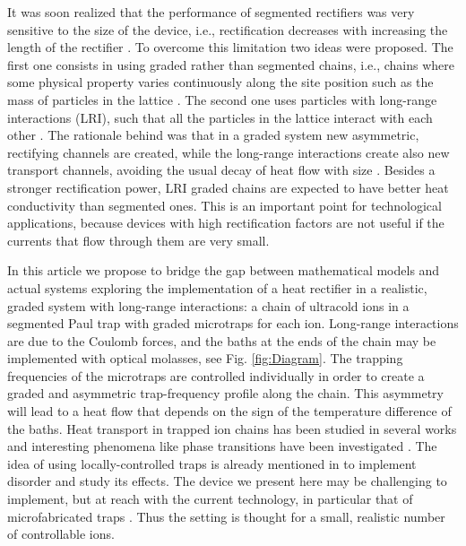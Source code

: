 It was soon realized that the performance of segmented rectifiers was very sensitive to the size of the device, i.e., rectification decreases with increasing the length of the rectifier \cite{Hu2006}. To overcome this limitation two ideas were proposed. The first one consists in using graded rather than segmented chains, i.e., chains where some physical property varies continuously along the site position such as the mass of particles in the lattice \cite{Wang2012,Chen2015,Romero-Bastida2017,Yang2007,Romero-Bastida2013,Dettori2016,Pereira2010,Pereira2011,Avila2013}. The second one uses particles with long-range interactions (LRI), such that all the particles in the lattice interact with each other \cite{Chen2015,Bagchi2017,Pereira2013}. The rationale behind was that in a graded system new asymmetric, rectifying channels are created, while the long-range interactions create
also new transport channels, avoiding the usual decay of heat flow with size \cite{Chen2015}.
%
%
Besides a stronger rectification power, LRI graded chains are expected to have better heat conductivity than segmented ones. This is an important point for technological applications, because devices with high rectification factors are not useful if the currents that flow through them are very small.

In this article we propose to bridge the gap between mathematical models and actual systems
exploring the implementation of a heat rectifier in a realistic, graded system with long-range interactions:
a chain of  ultracold ions in a segmented Paul trap with graded microtraps for each ion.
Long-range interactions are due to the Coulomb forces, and the  baths at the ends of the chain  may be implemented with optical molasses,
see Fig. \ref{fig:Diagram}. The trapping frequencies of the  microtraps are controlled individually in order to create a graded and asymmetric trap-frequency profile along the chain. This asymmetry will lead to a heat flow that depends on the sign of the temperature difference of the baths. Heat transport in trapped ion chains has been studied in several works  \cite{Freitas2015,Ruiz2014,Ruiz2019,Pruttivarasin2011,Ramm2014} and interesting phenomena like phase transitions have been investigated \cite{Freitas2015,Ruiz2014,Ruiz2019,Pruttivarasin2011}. The idea of using locally-controlled traps is already mentioned in \cite{Freitas2015} to implement disorder and study its effects. The device we present here may be challenging to implement, but at reach with the current technology, in particular  that of microfabricated traps \cite{Cirac2000,Krauth2014,Schmied2009}. Thus the setting is thought for a small, realistic number of controllable ions.

